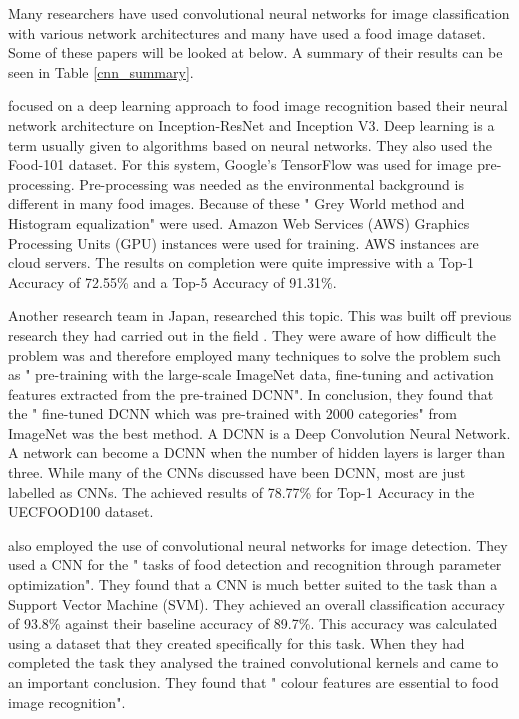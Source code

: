 Many researchers have used convolutional neural networks for image
classification with various network architectures and many have used a food image dataset.
Some of these papers will be looked at below.
A summary of their results can be seen in Table \ref{cnn_summary}.

\parencite{deepLearning} focused on a deep learning approach to food image recognition based
their neural network architecture on Inception-ResNet and Inception V3.
Deep learning is a term usually given to algorithms based on neural networks.
They also used the Food-101 dataset. For this system, Google's
TensorFlow was used for image pre-processing. Pre-processing was needed as the
environmental background is different in many food images. Because of these
" Grey World method and Histogram equalization" \parencite{deepLearning} were
used.
Amazon Web Services (AWS) Graphics Processing Units (GPU) instances were used for training.
AWS instances are cloud servers.
The results on completion were quite impressive with a Top-1 Accuracy of 72.55\% and a Top-5 Accuracy of 91.31\%.

Another research team in Japan, \parencite{yanaiFood} researched this topic. This was built off previous research they had carried out in the field \parencite{kawano2014food}.
They were aware of how
difficult the problem was and therefore employed many techniques to solve the
problem such as " pre-training with the large-scale ImageNet data, fine-tuning
and activation features extracted from the pre-trained DCNN". 
In conclusion, they found that the " fine-tuned DCNN which was pre-trained
with 2000 categories" from ImageNet was the best method. A
DCNN is a Deep Convolution Neural Network. 
A network can become a DCNN when the number of hidden layers is larger than three.
While many of the CNNs discussed have been DCNN, most are just labelled as CNNs.
The achieved results of 78.77\% for Top-1 Accuracy in the UECFOOD100 dataset.

\parencite{kagayaFood} also employed the use of convolutional neural networks for
image detection. They used a CNN for the " tasks of food detection and recognition
through parameter optimization".
They found that a CNN is much better suited to the task than a Support Vector
Machine (SVM). They achieved an overall classification accuracy of 93.8\%
against their baseline accuracy of 89.7\%. This accuracy
was calculated using a dataset that they created specifically for this task.
When they had completed the task they analysed the trained convolutional kernels
and came to an important conclusion. They found that " colour features are
essential to food image recognition".

